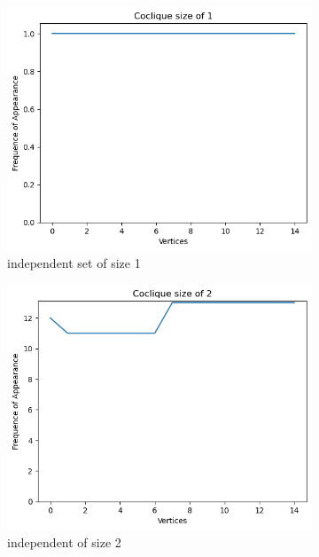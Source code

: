 \documentclass{amsart}
\theoremstyle{definition}
\begin{document}
\begin{appendix}
	\begin{figure}[hbt!]
		\caption*{Depth 4}
		\begin{subfigure}[b]{.45\textwidth}
			\centering
			\includegraphics[width=1\linewidth]{images/depth_4_size_1.png}
			\caption{independent set of size 1}
		\end{subfigure}
		\begin{subfigure}[b]{.45\textwidth}
			\centering
			\includegraphics[width=1\linewidth]{images/depth_4_size_2.png}
			\caption{independent of size 2}
		\end{subfigure}
		\begin{subfigure}[b]{.45\textwidth}

\end{subfigure}
\end{figure}
\end{appendix}
\end{document}

